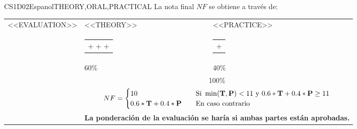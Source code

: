  
  \begin{evaluation}{CS1D02}{Espanol}{THEORY,ORAL,PRACTICAL}
    La nota final $NF$ se obtiene a través de:

  \begin{tabularx}{0.9\textwidth}{|X|p{}|p{}|} \hline
  \multirow{4}{*}{\uppercase{<<Evaluation>>}} & \uppercase{<<Theory>>} & \uppercase{<<Practice>>} \\ \cline{2-3}
  & %
      \begin{minipage}{0.95\textwidth}
      \begin{tabular}{l}
          $\text{\textbf{T}} = [<<ExamAcronym>>_{1}$  +
          $<<ExamAcronym>>_{2}$  +
          $<<ExamAcronym>>_{3}$ +
          $<<ExamAcronym>>_{4}]/4$
          \end{tabular}
      \end{minipage}
  & %
      \begin{minipage}{0.95\textwidth}
      \begin{tabular}{l}
          $\text{\textbf{P}} = [<<ContinuousAssessmentAcronym>>_{1}$ +
          $<<ContinuousAssessmentAcronym>>_{2}]/2$
      \end{tabular}
      \end{minipage}                 \\ \cline{2-3}

  & %
  60\% 
  & %
  40\% \\ \cline{2-3}
  & \multicolumn{2}{c|}{100\%}  \\ \cline{2-3}
  & \multicolumn{2}{c|}{
    \begin{math}
      NF =
      \begin{cases}
        10     & \quad \text{Si } \min(\text{\textbf{T}},\text{\textbf{P}}) < 11 \text{ y } 0.6*\text{\textbf{T}} + 0.4*\text{\textbf{P}} \geq 11 \\
        0.6*\text{\textbf{T}} + 0.4*\text{\textbf{P}}  & \quad \text{En caso contrario}
      \end{cases}
    \end{math}
  } \\ \cline{2-3}
  & \multicolumn{2}{c|}{\textbf{La ponderación de la evaluación se haría si ambas partes están aprobadas.}}  \\ \hline
  \end{tabularx}


\end{evaluation}

